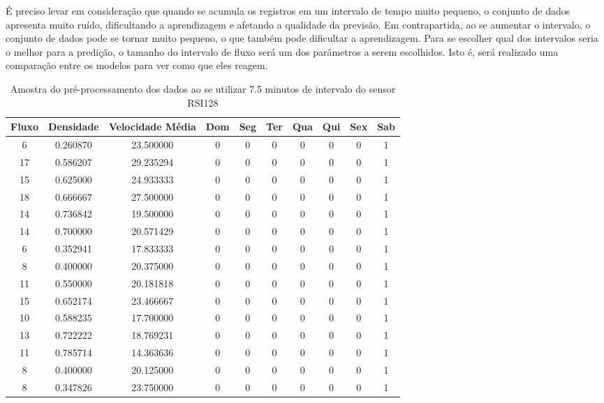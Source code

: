 É preciso levar em consideração que quando se acumula os registros em um intervalo de tempo muito pequeno, o conjunto de dados apresenta muito ruído, dificultando a aprendizagem e afetando a qualidade da previsão. Em contrapartida, ao se aumentar o intervalo, o conjunto de dados pode se tornar muito pequeno, o que também pode dificultar a aprendizagem. Para se escolher qual dos intervalos seria o melhor para a predição, o tamanho do intervalo de fluxo será um dos parâmetros a serem escolhidos. Isto é, será realizado uma comparação entre os modelos para ver como que eles reagem. 

\begin{table}[H]
    \begin{tabular}{cccccccccc}
    \toprule
    \multicolumn{1}{l}{\textbf{Fluxo}} & \multicolumn{1}{l}{\textbf{Densidade}} & \multicolumn{1}{l}{\textbf{Velocidade Média}} & \multicolumn{1}{l}{\textbf{Dom}} &
    \multicolumn{1}{l}{\textbf{Seg}} & \multicolumn{1}{l}{\textbf{Ter}} & \multicolumn{1}{l}{\textbf{Qua}} & \multicolumn{1}{l}{\textbf{Qui}} &
    \multicolumn{1}{l}{\textbf{Sex}} &
    \multicolumn{1}{l}{\textbf{Sab}} \\
    \midrule
     6 & 0.260870 & 23.500000 & 0 & 0 & 0 & 0 & 0 & 0 & 1 \\
    \midrule
    17 & 0.586207 & 29.235294 & 0 & 0 & 0 & 0 & 0 & 0 & 1 \\
    \midrule
    15 & 0.625000 & 24.933333 & 0 & 0 & 0 & 0 & 0 & 0 & 1 \\
    \midrule
    18 & 0.666667 & 27.500000 & 0 & 0 & 0 & 0 & 0 & 0 & 1 \\
    \midrule
    14 & 0.736842 & 19.500000 & 0 & 0 & 0 & 0 & 0 & 0 & 1 \\
    \midrule
    14 & 0.700000 & 20.571429 & 0 & 0 & 0 & 0 & 0 & 0 & 1 \\
    \midrule
     6 & 0.352941 & 17.833333 & 0 & 0 & 0 & 0 & 0 & 0 & 1 \\
    \midrule
     8 & 0.400000 & 20.375000 & 0 & 0 & 0 & 0 & 0 & 0 & 1 \\
    \midrule
    11 & 0.550000 & 20.181818 & 0 & 0 & 0 & 0 & 0 & 0 & 1 \\
    \midrule
    15 & 0.652174 & 23.466667 & 0 & 0 & 0 & 0 & 0 & 0 & 1 \\
    \midrule
    10 & 0.588235 & 17.700000 & 0 & 0 & 0 & 0 & 0 & 0 & 1 \\
    \midrule
    13 & 0.722222 & 18.769231 & 0 & 0 & 0 & 0 & 0 & 0 & 1 \\
    \midrule
    11 & 0.785714 & 14.363636 & 0 & 0 & 0 & 0 & 0 & 0 & 1 \\
    \midrule
     8 & 0.400000 & 20.125000 & 0 & 0 & 0 & 0 & 0 & 0 & 1 \\
    \midrule
     8 & 0.347826 & 23.750000 & 0 & 0 & 0 & 0 & 0 & 0 & 1 \\
    \bottomrule
    \end{tabular}
    \label{table:data_pre}
    \caption{Amostra do pré-processamento dos dados ao se utilizar 7.5 minutos de intervalo do sensor RSI128}
\end{table}

